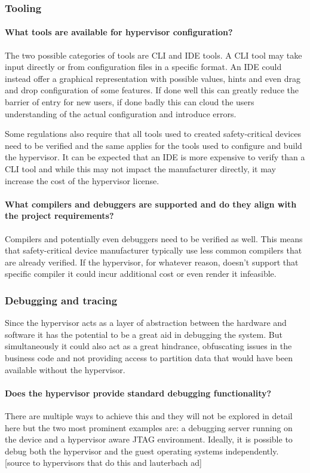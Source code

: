 \subsubsection{Tooling}
\paragraph{What tools are available for hypervisor configuration?}
The two possible categories of tools are \gls{CLI} and \gls{IDE} tools. A \gls{CLI} tool may take input directly or from configuration files in a specific format. An \gls{IDE} could instead offer a graphical representation with possible values, hints and even drag and drop configuration of some features. If done well this can greatly reduce the barrier of entry for new users, if done badly this can cloud the users understanding of the actual configuration and introduce errors.

Some regulations also require that all tools used to created safety-critical devices need to be verified and the same applies for the tools used to configure and build the hypervisor. It can be expected that an \gls{IDE} is more expensive to verify than a \gls{CLI} tool and while this may not impact the manufacturer directly, it may increase the cost of the hypervisor license.
\paragraph{What compilers and debuggers are supported and do they align with the project requirements?}
Compilers and potentially even debuggers need to be verified as well. This means that safety-critical device manufacturer typically use less common compilers that are already verified. If the hypervisor, for whatever reason, doesn't support that specific compiler it could incur additional cost or even render it infeasible.
\subsubsection{Debugging and tracing}
Since the hypervisor acts as a layer of abstraction between the hardware and software it has the potential to be a great aid in debugging the system. But simultaneously it could also act as a great hindrance, obfuscating issues in the business code and not providing access to partition data that would have been available without the hypervisor.
\paragraph{Does the hypervisor provide standard debugging functionality?}
There are multiple ways to achieve this and they will not be explored in detail here but the two most prominent examples are: a debugging server running on the device and a hypervisor aware \gls{JTAG} environment. Ideally, it is possible to debug both the hypervisor and the guest operating systems independently. [source to hypervisors that do this and lauterbach ad]
